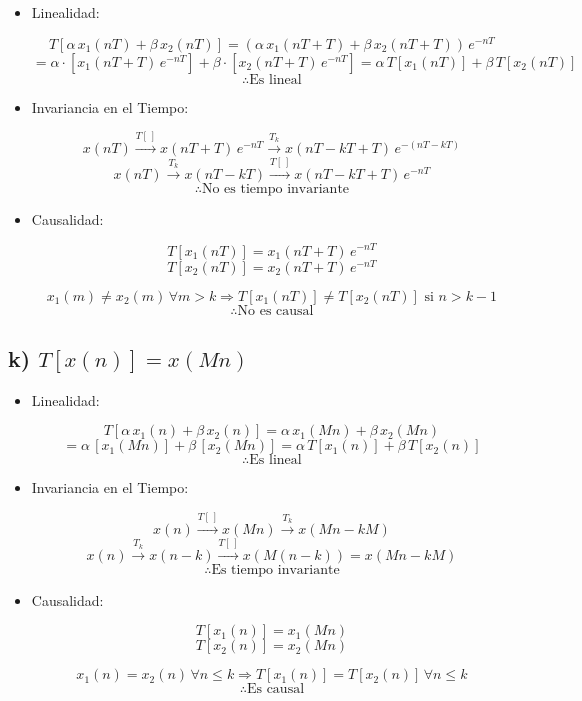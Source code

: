 \begin{itemize}
    \item Linealidad:
    
    \[T[\alpha\, x_1(nT) + \beta\, x_2(nT)] = (\alpha\, x_1(nT+T) + \beta\, x_2(nT+T))\,e^{-nT}\]
\[= \alpha \cdot [x_1(nT+T)\,e^{-nT}] + \beta \cdot [x_2(nT+T)\,e^{-nT}] = \alpha\, T[x_1(nT)] + \beta \, T[x_2(nT)]\]
 $$\therefore \text{Es lineal}$$
 
    \item Invariancia en el Tiempo:
    
    \[x(nT) \xrightarrow{T[\,]} x(nT+T)\,e^{-nT}\xrightarrow{T_k} x(nT-kT+T)\,e^{-(nT-kT)} \]
\[x(nT) \xrightarrow{T_k} x(nT-kT) \xrightarrow{T[\,]} x(nT-kT+T)\,e^{-nT}\]
    $$\therefore \text{No es tiempo invariante}$$
    
    \item Causalidad:
    
    \[T[x_1(nT)] = x_1(nT+T)\,e^{-nT}\]
\[T[x_2(nT)] = x_2(nT+T)\,e^{-nT}\]

\[x_1(m)\neq x_2(m) \,\forall m>k \Rightarrow T[x_1(nT)]\neq T[x_2(nT)] \text{ si } n > k-1 \]
 $$\therefore \text{No es causal}$$
    
\end{itemize}

\subsection*{k) $T[x(n)]=x(Mn)$}

\begin{itemize}
    \item Linealidad:
    
    \[T[\alpha\, x_1(n) + \beta\, x_2(n)] = \alpha\, x_1(Mn) + \beta\, x_2(Mn)\]
    \[=  \alpha\, [x_1(Mn)] + \beta\, [x_2(Mn)] = \alpha\, T[ x_1(n)] + \beta\, T[x_2(n)]\]
     $$\therefore \text{Es lineal}$$
     
    \item Invariancia en el Tiempo:
    
     \[x(n) \xrightarrow{T[\,]} x(Mn)\xrightarrow{T_k} x(Mn-kM) \]
     \[x(n) \xrightarrow{T_k} x(n-k) \xrightarrow{T[\,]} x(M(n-k)) = x(Mn-kM)\]
    $$\therefore \text{Es tiempo invariante}$$
    
    \item Causalidad:
    
     \[T[x_1(n)] = x_1(Mn)\]
\[T[x_2(n)] = x_2(Mn)\]

\[x_1(n)=x_2(n) \,\forall n\leq k \Rightarrow T[x_1(n)]=T[x_2(n)] \,\forall n\leq k \]
 $$\therefore \text{Es causal}$$
    
\end{itemize}